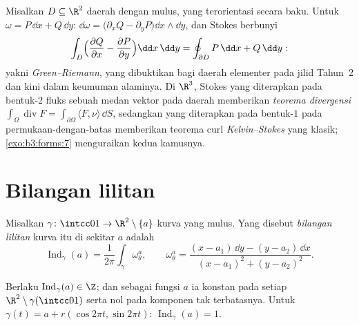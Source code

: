 \begin{example}
\label{ex:b3:forms:classical}
Misalkan $D \subseteq \R^2$ daerah  dengan 
mulus, yang terorientasi secara baku. Untuk $\omega = P\,\dd x +
Q\,\dd y$: $\dd\omega = \bigl(\partial_xQ -
\partial_yP\bigr)\dd x\wedge\dd y$, dan Stokes berbunyi
\[
\int_D\Bigl(\frac{\partial Q}{\partial x} -
\frac{\partial P}{\partial y}\Bigr)\dd x\,\dd y
= \oint_{\partial D}P\,\dd x + Q\,\dd y :
\]
yakni \emph{Green--Riemann}, yang dibuktikan bagi daerah elementer pada
jilid Tahun~2 dan kini dalam keumuman alaminya. Di $\R^3$,
Stokes yang diterapkan pada bentuk-$2$ fluks sebuah medan vektor pada
daerah  memberikan \emph{teorema divergensi}
$\int_\Omega\operatorname{div}F =
\int_{\partial\Omega}\langle F, \nu\rangle\,\dd S$, sedangkan
yang diterapkan pada bentuk-$1$ pada permukaan-dengan-batas memberikan
teorema curl \emph{Kelvin--Stokes} yang klasik;
\cref{exo:b3:forms:7} menguraikan kedua kamusnya.
\end{example}

\section{Bilangan lilitan}\label{sec:b3:forms:winding}

\begin{definition}\label{def:b3:forms:winding}
Misalkan $\gamma\colon\intcc01\to\R^2\setminus\{a\}$ kurva
 yang mulus. Yang disebut \emph{bilangan lilitan} kurva itu di sekitar $a$ adalah
\[
\operatorname{Ind}_\gamma(a) =
\frac1{2\pi}\int_\gamma\omega_\theta^a,
\qquad
\omega_\theta^a = \frac{(x - a_1)\,\dd y - (y - a_2)\,\dd
x}{(x - a_1)^2 + (y - a_2)^2} .
\]
\end{definition}

\begin{proposition}\label{prop:b3:forms:windinginteger}
Berlaku $\operatorname{Ind}_\gamma(a) \in \Z$; dan sebagai fungsi $a$
ia konstan pada setiap 
$\R^2\setminus\gamma(\intcc01)$ serta nol pada komponen
tak terbatasnya. Untuk $\gamma(t) = a + r(\cos2\pi t, \sin2\pi t)$:
$\operatorname{Ind}_\gamma(a) = 1$.
\end{proposition}

